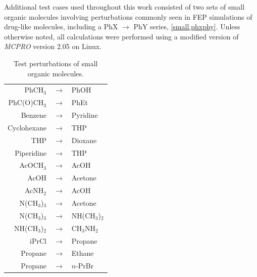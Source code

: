 \documentclass[12pt]{report}
\begin{document}
Additional test cases used throughout this work consisted of two sets of small organic molecules involving perturbations commonly seen in FEP simulations of drug-like molecules, including a PhX $\longrightarrow$ PhY series, \cref{small,phxphy}. Unless otherwise noted, all calculations were performed using a modified version of \textit{MCPRO} \cite{jorgmcp} version 2.05 on Linux.

\begin{table}[p]
\centering
\caption{Test perturbations of small organic molecules.}
\begin{tabular}{rcl}
\toprule
PhCH$_3$  & $\longrightarrow$ &  PhOH \\
PhC(O)CH$_3$  & $\longrightarrow$ &  PhEt \\
Benzene  & $\longrightarrow$ &  Pyridine   \\
Cyclohexane  & $\longrightarrow$ &  THP \\
THP & $\longrightarrow$ & Dioxane   \\
Piperidine & $\longrightarrow$ &  THP    \\
AcOCH$_3$ & $\longrightarrow$ & AcOH    \\
AcOH & $\longrightarrow$ & Acetone   \\
AcNH$_2$ & $\longrightarrow$ & AcOH   \\
N(CH$_3$)$_3$ & $\longrightarrow$ & Acetone   \\ 
N(CH$_3$)$_3$ & $\longrightarrow$ & NH(CH$_3$)$_2$   \\ 
NH(CH$_3$)$_2$ & $\longrightarrow$ & CH$_3$NH$_2$   \\
iPrCl & $\longrightarrow$ & Propane   \\
Propane & $\longrightarrow$ & Ethane   \\
Propane & $\longrightarrow$ & $n$-PrBr   \\
\bottomrule
\end{tabular}
\label{small}
\end{table}
\end{document}
